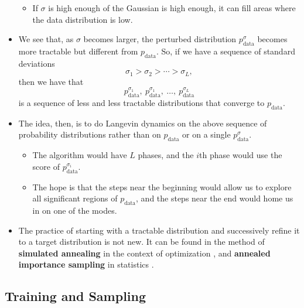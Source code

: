 \documentclass[10pt]{article}
\newcommand{\mrm}[1]{\mathrm{#1}}
\begin{document}
\begin{itemize}
\begin{itemize}
    \item If $\sigma$ is high enough of the Gaussian is high enough, it can fill areas where the data distribution is low.
  \end{itemize}

  \item We see that, as $\sigma$ becomes larger, the perturbed distribution $p^\sigma_{\mrm{data}}$ becomes more tractable but different from $p_{\mrm{data}}$. So, if we have a sequence of standard deviations $$\sigma_1 > \sigma_2 > \dotsb > \sigma_L,$$ then we have that $$p_{\mrm{data}}^{\sigma_1},\ p_{\mrm{data}}^{\sigma_1},\ \dotsc,\ p_{\mrm{data}}^{\sigma_L}$$ is a sequence of less and less tractable distributions that converge to $p_{\mrm{data}}$.
  
  \item The idea, then, is to do Langevin dynamics on the above sequence of probability distributions rather than on $p_{\mrm{data}}$ or on a single $p_{\mrm{data}}^\sigma.$
  \begin{itemize}
    \item The algorithm would have $L$ phases, and the $i$th phase would use the score of $p_{\mrm{data}}^{\sigma_i}$. 
    
    \item The hope is that the steps near the beginning would allow us to explore all significant regions of $p_{\mrm{data}}$, and the steps near the end would home us in on one of the modes.
  \end{itemize}

  \item The practice of starting with a tractable distribution and successively refine it to a target distribution is not new. It can be found in the method of {\bf simulated annealing} in the context of optimization \cite{Kirkpatrick:1983}, and {\bf annealed importance sampling} in statistics \cite{Neal:1998}.
\end{itemize}
  
\subsection{Training and Sampling}
\end{document}
